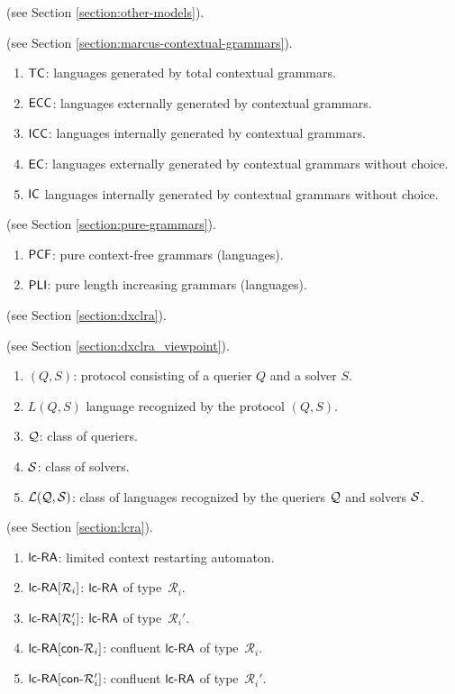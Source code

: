  (see Section \ref{section:other-models}).

 (see Section \ref{section:marcus-contextual-grammars}).

\begin{enumerate}[]
\item $\textup{\sf TC}$: languages generated by total contextual grammars.
\item $\textup{\sf ECC}$: languages externally generated by contextual grammars.
\item $\textup{\sf ICC}$: languages internally generated by contextual grammars.
\item $\textup{\sf EC}$: languages externally generated by contextual grammars without choice.
\item $\textup{\sf IC}$ languages internally generated by contextual grammars without choice.
\end{enumerate}

 (see Section \ref{section:pure-grammars}).

\begin{enumerate}[]
\item $\textup{\sf PCF}$: pure context-free grammars (languages).
\item $\textup{\sf PLI}$: pure length increasing grammars (languages).
\end{enumerate}

 (see Section \ref{section:dxclra}).

 (see Section \ref{section:dxclra_viewpoint}).

\begin{enumerate}[]
\item $(Q, S)$: protocol consisting of a querier $Q$ and a solver $S$.
\item $L(Q, S)$ language recognized by the protocol $(Q, S)$.
\item $\mathcal{Q}$: class of queriers.
\item $\mathcal{S}$: class of solvers.
\item ${\cal L}(\mathcal{Q}, \mathcal{S})$: class of languages recognized by the queriers $\mathcal{Q}$ and solvers $\mathcal{S}$.
\end{enumerate}

 (see Section \ref{section:lcra}).

\begin{enumerate}[]
\item $\lcRA$: limited context restarting automaton.
\item $\lcRA[i]$: $\lcRA$ of type~$\mathcal{R}_i$.
\item $\lcRAp[i]$: $\lcRA$ of type~$\mathcal{R}_i'$.
\item $\textup{\sf lc-RA$[\textup{\sf con-}\mathcal{R}_i]$}$: confluent $\lcRA$ of type~$\mathcal{R}_i$.
\item $\textup{\sf lc-RA$[\textup{\sf con-}\mathcal{R}_i']$}$: confluent $\lcRA$ of type~$\mathcal{R}_i'$.
\end{enumerate}
